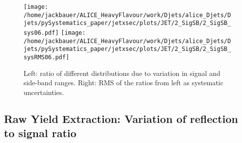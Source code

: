 \begin{figure}[bth]
\begin{center}
\texttt{[image: /home/jackbauer/ALICE\_HeavyFlavour/work/Djets/alice\_Djets/Djets/pySystematics\_paper/jetxsec/plots/JET/2\_SigSB/2\_SigSB\_sys06.pdf]}
\texttt{[image: /home/jackbauer/ALICE\_HeavyFlavour/work/Djets/alice\_Djets/Djets/pySystematics\_paper/jetxsec/plots/JET/2\_SigSB/2\_SigSB\_sysRMS06.pdf]}
\caption{Left: ratio of different distributions due to variation in signal and side-band ranges. Right: RMS of the ratios from left as systematic uncertainties.} 
\label{fig:JetPtSys_Dzero_SBvariatonR06}
\end{center}
\end{figure}
\FloatBarrier
\subsection{Raw Yield Extraction: Variation of reflection to signal ratio}\label{subsec:reflection}

